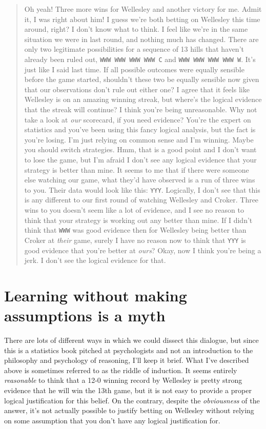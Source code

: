 \begin{quote}
\begin{dialogue}
 Oh yeah! Three more wins for Wellesley and another victory for me. Admit it, I was right about him! I guess we're both betting on Wellesley this time around, right?
 I don't know what to think. I feel like we're in the same situation we were in last round, and nothing much has changed. There are only two legitimate possibilities for a sequence of 13 hills that haven't already been ruled out, \texttt{WWW WWW WWW WWW C} and \texttt{WWW WWW WWW WWW W}. It's just like I said last time. If all possible outcomes were equally sensible before the game started, shouldn't these two be equally sensible now given that our observations don't rule out either one? I agree that it feels like Wellesley is on an amazing winning streak, but where's the logical evidence that the streak will continue?
 I think you're being unreasonable. Why not take a look at {\it our} scorecard, if you need evidence? You're the expert on statistics and you've been using this fancy logical analysis, but the fact is you're losing. I'm just relying on common sense and I'm winning. Maybe you should switch strategies.
 Hmm, that is a good point and I don't want to lose the game, but I'm afraid I don't see any logical evidence that your strategy is better than mine. It seems to me that if there were someone else watching our game, what they'd have observed is a run of three wins to you. Their data would look like this: \texttt{YYY}. Logically, I don't see that this is any different to our first round of watching Wellesley and Croker. Three wins to you doesn't seem like a lot of evidence, and I see no reason to think that your strategy is working out any better than mine. If I didn't think that \texttt{WWW} was good evidence then for Wellesley being better than Croker at {\it their} game, surely I have no reason now to think that \texttt{YYY} is good evidence that you're better at {\it ours}?
 Okay, now I think you're being a jerk.
 I don't see the logical evidence for that.
\end{dialogue}
\end{quote}

\section*{Learning without making assumptions is a myth}

There are lots of different ways in which we could dissect this dialogue, but since this is a statistics book pitched at psychologists and not an introduction to the philosophy and psychology of reasoning, I'll keep it brief. What I've described above is sometimes referred to as the riddle of induction. It seems entirely {\it reasonable} to think that a 12-0 winning record by Wellesley is pretty strong evidence that he will win the 13th game, but it is not easy to provide a proper logical justification for this belief. On the contrary, despite the {\it obviousness} of the answer, it's not actually possible to justify betting on Wellesley without relying on some assumption that you don't have any logical justification for. 

